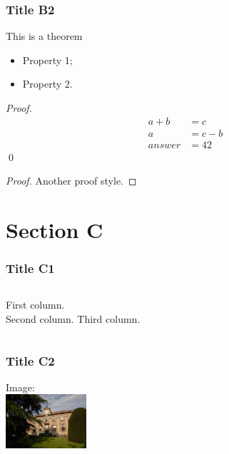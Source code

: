 \documentclass{beamer}
\begin{document}

\begin{frame}
\frametitle{Title B2}

\begin{theorem}[Th. Name]
\label{thlabel} This is a theorem
\begin{itemize}
\item Property 1;
\item Property 2.
\end{itemize}
\end{theorem}

\pause

\textit{Proof. }
\begin{align}
    a + b & = c \\
    a & = c - b \\
    answer & = 42
\end{align}
\qed

\pause

\begin{proof}
Another proof style.
\end{proof}

\end{frame}

\section{Section C}

\begin{frame}
\frametitle{Title C1}

\begin{columns}[t, onlytextwidth]
First column.\\
\pause{}
Second column.
\pause
{}
Third column.
\end{columns}

\end{frame}


\begin{frame}
\frametitle{Title C2}


\centering
Image:\\
\bigskip\bigskip
\includegraphics[height=2cm]{style_img/20090504_Politecnico_0006_02}

\end{frame}
\end{document}
